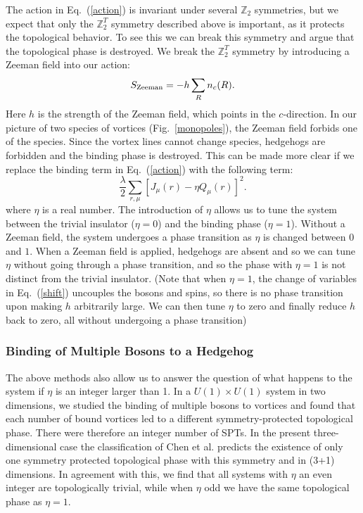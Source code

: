 \documentclass[prb,twocolumn]{revtex4-1}
\def\ztwo{\mathbb{Z}_2}
\def\ztwot{\mathbb{Z}_2^T}
\begin{document}
The action in Eq.~(\ref{action}) is invariant under several $\ztwo$ symmetries, but we expect that only the $\ztwot$ symmetry described above is important, as it protects the topological behavior. To see this we can break this symmetry and argue that the topological phase is destroyed.
We break the $\ztwot$ symmetry by introducing a Zeeman field into our action:
\begin{equation}
S_{\rm Zeeman}=-h\sum_R n_c(R).
\label{Zeeman}
\end{equation}
Here $h$ is the strength of the Zeeman field, which points in the $c$-direction. In our picture of two species of vortices (Fig.~\ref{monopoles}), the Zeeman field forbids one of the species. Since the vortex lines cannot change species, hedgehogs are forbidden and the binding phase is destroyed. 
This can be made more clear if we replace the binding term in Eq.~(\ref{action}) with the following term:
\begin{equation}
\frac{\lambda}{2}\sum_{r,\mu} [ J_\mu(r)- \eta Q_\mu(r)]^2.
\label{tbind}
\end{equation}
where $\eta$ is a real number. The introduction of $\eta$ allows us to tune the system between the trivial insulator ($\eta=0$)  and the binding phase ($\eta=1$). Without a Zeeman field, the system undergoes a phase transition as $\eta$ is changed between $0$ and $1$. 
When a Zeeman field is applied, hedgehogs are absent and so we can tune $\eta$ without going through a phase transition, and so the phase with $\eta=1$ is not distinct from the trivial insulator.
(Note that when $\eta=1$, the change of variables in Eq.~(\ref{shift}) uncouples the bosons and spins, so there is no phase transition upon making $h$ arbitrarily large. We can then tune $\eta$ to zero and finally reduce $h$ back to zero, all without undergoing a phase transition)

\subsubsection{Binding of Multiple Bosons to a Hedgehog}
The above methods also allow us to answer the question of what happens to the system if $\eta$ is an integer larger than 1.  In a $U(1)\times U(1)$ system in two dimensions, we studied the binding of multiple bosons to vortices and found that each number of bound vortices led to a different symmetry-protected topological phase. There were therefore an integer number of SPTs.\cite{FQHE} In the present three-dimensional case the classification of Chen et al.\cite{WenScience,*WenPRB} predicts the existence of only one symmetry protected topological phase with this symmetry and in (3+1) dimensions. In agreement with this, we find that all systems with $\eta$ an even integer are topologically trivial, while when $\eta$ odd we have the same topological phase as $\eta=1$. 
\end{document}
